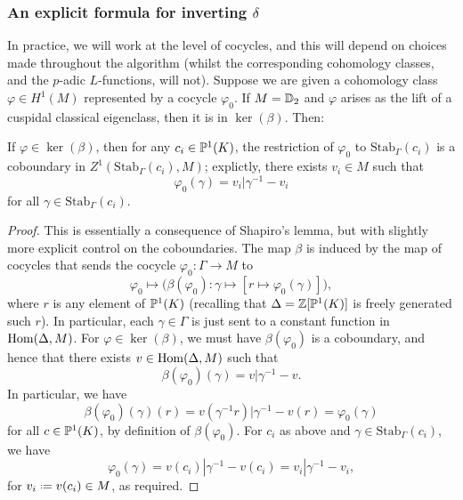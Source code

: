 \documentclass[a4paper,11pt]{article}
\numberwithin{equation}{section}
\begin{document}
\subsubsection{An explicit formula for inverting $\delta$}

In practice, we will work at the level of cocycles, and this will depend on choices made throughout the algorithm (whilst the corresponding cohomology classes, and the $p$-adic $L$-functions, will not). Suppose we are given a cohomology class $\varphi \in H^1(M)$ represented by a cocycle $\varphi_0$. If $M = \mathbb{D}_2$ and $\varphi$ arises as the lift of a cuspidal classical eigenclass, then it is in $\ker(\beta)$. Then:

\begin{proposition}\label{prop:stab coboundaries}
If $\varphi \in \ker(\beta)$, then for any $c_i \in \mathbb{P}^1(K)$, the restriction of $\varphi_0$ to $\mathrm{Stab}_\Gamma(c_i)$ is a coboundary in $Z^1(\mathrm{Stab}_\Gamma(c_i),M)$; explictly, there exists $v_i \in M$ such that
\[
	\varphi_0(\gamma) = v_i|\gamma^{-1} - v_i
\]
for all $\gamma \in \mathrm{Stab}_\Gamma(c_i)$.
\end{proposition}
\begin{proof}
	This is essentially a consequence of Shapiro's lemma, but with slightly more explicit control on the coboundaries. The map $\beta$ is induced by the map of cocycles that sends the cocycle $\varphi_0 : \Gamma \to M$ to
	\[
		\varphi_0 \longmapsto \bigg(\beta\left(\varphi_0\right) : \gamma \mapsto \left[r \mapsto \varphi_0(\gamma)\right]\bigg),
	\]
	where $r$ is any element of $\mathbb{P}^1(K)$ (recalling that $\Delta = \mathbb{Z}[\mathbb{P}^1(K)]$ is freely generated such $r$). In particular, each $\gamma \in \Gamma$ is just sent to a constant function in $\mathrm{Hom}(\Delta,M)$. For $\varphi \in \ker(\beta)$, we must have $\beta(\varphi_0)$ is a coboundary, and hence that there exists $v \in \mathrm{Hom}(\Delta,M)$ such that 
	\[
		\beta(\varphi_0)(\gamma) = v|\gamma^{-1} - v.
	\]
	In particular, we have 
	\[
		\beta(\varphi_0)(\gamma)(r) = v(\gamma^{-1} r)|\gamma^{-1} - v(r) = \varphi_0(\gamma)
	\]
	for all $c \in \mathbb{P}^1(K)$, by definition of $\beta(\varphi_0)$. For $c_i$ as above and $\gamma \in \mathrm{Stab}_\Gamma(c_i)$, we have
	\[
		\varphi_0(\gamma) = v(c_i)|\gamma^{-1} - v(c_i) = v_i|\gamma^{-1} - v_i,
	\]
	for $v_i \defeq v(c_i) \in M$, as required.
\end{proof}
\end{document}
